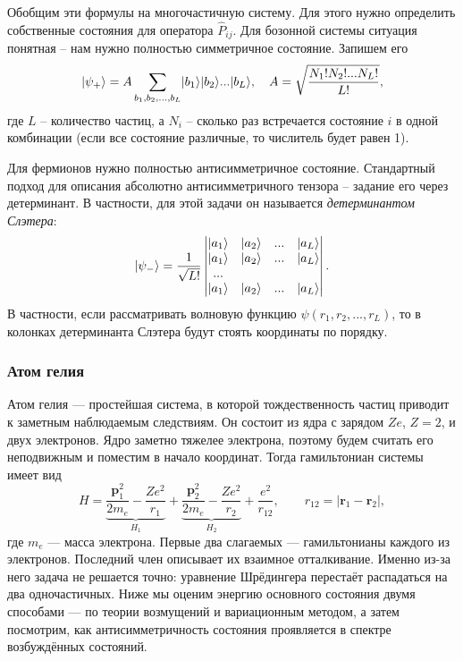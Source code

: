 Обобщим эти формулы на многочастичную систему. Для этого нужно определить
собственные состояния для оператора $\hat{P}_{ij}$. Для бозонной системы
ситуация понятная -- нам нужно полностью симметричное состояние. Запишем его
\[
  \lvert\psi_+\rangle = A\sum_{b_1, b_2,..., b_L}\lvert b_1\rangle\lvert b_2\rangle...\lvert b_L\rangle,\quad
  A = \sqrt{\frac{N_1!N_2!...N_L!}{L!}},
\]
где $L$ -- количество частиц, а $N_i$ -- сколько раз встречается состояние $i$
в одной комбинации (если все состояние различные, то числитель будет равен 1).

Для фермионов нужно полностью антисимметричное состояние. Стандартный подход
для описания абсолютно антисимметричного тензора -- задание его через
детерминант. В частности, для этой задачи он называется \textit{детерминантом
  Слэтера}:
\[
  \lvert\psi_-\rangle = \frac{1}{\sqrt{L!}} \begin{vmatrix}\lvert a_1\rangle& \lvert a_2\rangle & ... & \lvert a_L\rangle\\
    \lvert a_1\rangle& \lvert a_2\rangle & ... & \lvert a_L\rangle\\
    ...\\
    \lvert a_1\rangle& \lvert a_2\rangle & ... & \lvert a_L\rangle
  \end{vmatrix}.
\]
В частности, если рассматривать волновую функцию $\psi(r_1, r_2, ..., r_L)$, то
в колонках детерминанта Слэтера будут стоять координаты по порядку.

\subsubsection{Атом гелия}
Атом гелия --- простейшая система, в которой тождественность частиц приводит к
заметным наблюдаемым следствиям. Он состоит из ядра с зарядом $Ze$, $Z = 2$, и
двух электронов. Ядро заметно тяжелее электрона, поэтому будем считать его
неподвижным и поместим в начало координат. Тогда гамильтониан системы имеет вид
\[
  H = \underbrace{\frac{\mathbf{p}_1^2}{2m_e} - \frac{Ze^2}{r_1}}_{H_1}
  + \underbrace{\frac{\mathbf{p}_2^2}{2m_e} - \frac{Ze^2}{r_2}}_{H_2}
  + \frac{e^2}{r_{12}}, \qquad r_{12} = |\mathbf{r}_1 - \mathbf{r}_2|,
\]
где $m_e$ --- масса электрона. Первые два слагаемых --- гамильтонианы каждого
из электронов. Последний член описывает их взаимное отталкивание. Именно из-за
него задача не решается точно: уравнение Шрёдингера перестаёт распадаться на
два одночастичных. Ниже мы оценим энергию основного состояния двумя способами
--- по теории возмущений и вариационным методом, а затем посмотрим, как
антисимметричность состояния проявляется в спектре возбуждённых состояний.

